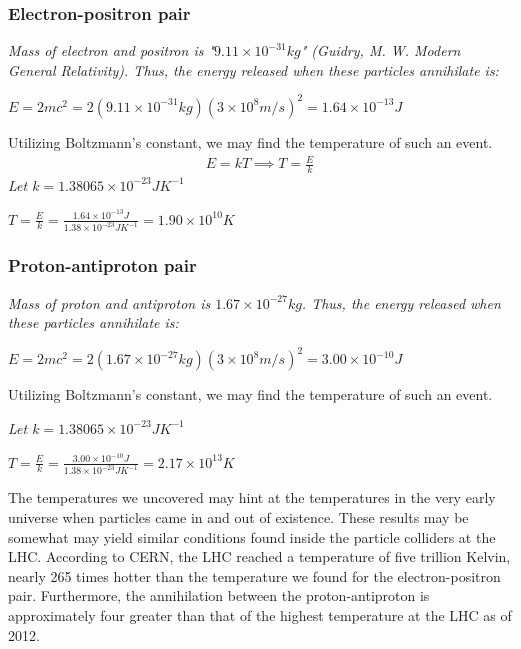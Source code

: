 \documentclass{article}
\begin{document}
{\subsubsection{Electron-positron pair}
\textit{Mass of electron and positron is "$9.11\times10^{-31}kg$"	(Guidry, M. W. Modern General Relativity). Thus, the energy released when these particles annihilate is:}
\begin{center}
$\boxed{E = 2mc^2 = 2(9.11\times10^{-31}kg)(3\times10^8m/s)^2 = 1.64\times10^{-13}J}
$
\end{center}
Utilizing Boltzmann's constant, we may find the temperature of such an event.
\begin{gather*}
E = kT \implies T = \frac{E}{k}
\end{gather*}
\textit{Let $k = 1.38065\times10^{-23}JK^{-1}$
}
\begin{center}
	$\boxed{T = \frac{E}{k} = \frac{1.64\times10^{-13}J}{1.38\times10^{-23}JK^{-1}}=1.90\times10^{10}K}
	$
\end{center}
\subsubsection{Proton-antiproton pair}
\textit{Mass of proton and antiproton is $1.67\times10^{-27}kg$. Thus, the energy released when these particles annihilate is:}
\begin{center}
$\boxed{E = 2mc^2 = 2(1.67\times10^{-27}kg)(3\times10^8m/s)^2 = 3.00\times10^{-10}J}
$
\end{center}
Utilizing Boltzmann's constant, we may find the temperature of such an event.

\textit{Let $k = 1.38065\times10^{-23}JK^{-1}$
}
\begin{center}
	$\boxed{T = \frac{E}{k} = \frac{3.00\times10^{-10}J}{1.38\times10^{-23}JK^{-1}}=2.17\times10^{13}K}
	$

\end{center}

The temperatures we uncovered may hint at the temperatures in the very early universe when particles came in and out of existence. These results may be somewhat may yield similar conditions found inside the particle colliders at the LHC. According to CERN, the LHC reached a temperature of five trillion Kelvin, nearly 265 times hotter than the temperature we found for the electron-positron pair. Furthermore, the annihilation between the proton-antiproton is approximately four greater than that of the highest temperature at the LHC as of 2012. 

}
\end{document}
